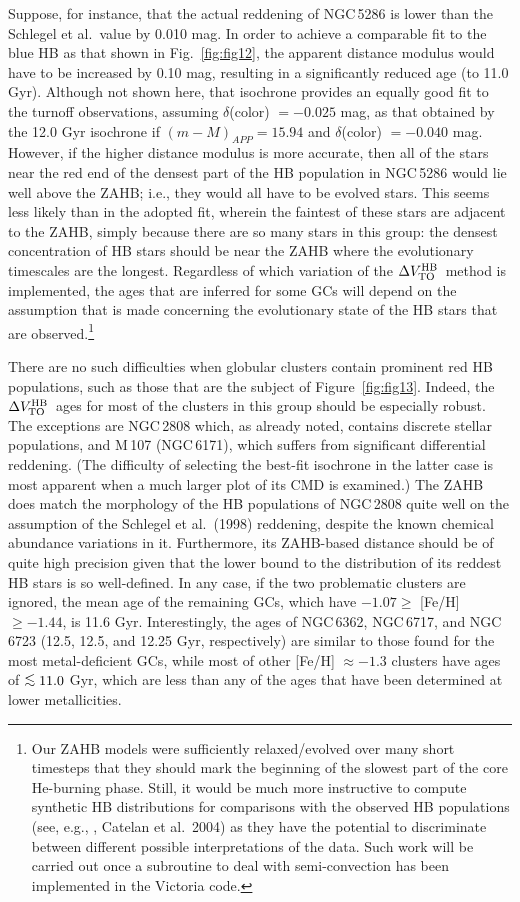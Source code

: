 \documentclass[12pt,preprint]{aastex}
\newcommand\delv{\Delta V^{\rm HB}_{\rm TO}}
\newcommand\lta{\mathrel{\hbox{\raise 0.6 ex \hbox{$<$}\kern
                   -1.8 ex\lower .5 ex\hbox{$\sim$}}}}
\begin{document}
Suppose, for instance, that the actual reddening of NGC$\,$5286 is lower than
the Schlegel et al.~value by 0.010 mag.  In order to achieve a comparable fit to
the blue HB as that shown in Fig.~\ref{fig:fig12}, the apparent distance modulus
would have to be increased by 0.10 mag, resulting in a significantly reduced age
(to 11.0 Gyr).  Although not shown here, that isochrone provides an equally good
fit to the turnoff observations, assuming $\delta$(color) $= -0.025$ mag, as
that obtained by the 12.0 Gyr isochrone if $(m-M)_{APP} = 15.94$ and
$\delta$(color) $= -0.040$ mag. However, if the higher distance modulus is more
accurate, then all of the stars near the red end of the densest part of the HB
population in NGC$\,$5286 would lie well above the ZAHB; i.e., they would all
have to be evolved stars.  This seems less likely than in the adopted fit,
wherein the faintest of these stars are adjacent to the ZAHB, simply because
there are so many stars in this group: the densest concentration of HB stars
should be near the ZAHB where the evolutionary timescales are the longest.
Regardless of which variation of the $\delv$\ method is implemented, the ages
that are inferred for some GCs will depend on the assumption that is made
concerning the evolutionary state of the HB stars that are
observed.\footnote{Our ZAHB models were sufficiently relaxed/evolved over many
short timesteps that they should mark the beginning of the slowest part of the
core He-burning phase.  Still, it would be much more instructive to compute
synthetic HB distributions for comparisons with the observed HB populations
(see, e.g., \citealt{ccc04}, Catelan et al.~2004) as they have the potential to
discriminate between different possible interpretations of the data.  Such work
will be carried out once a subroutine to deal with semi-convection has been
implemented in the Victoria code.}

There are no such difficulties when globular clusters contain prominent red HB
populations, such as those that are the subject of Figure~\ref{fig:fig13}.
Indeed, the $\delv$\ ages for most of the clusters in this group should be
especially robust.  The exceptions are NGC$\,$2808 which, as already noted,
contains discrete stellar populations, and M$\,$107 (NGC$\,$6171), which suffers
from significant differential reddening.  (The difficulty of selecting the
best-fit isochrone in the latter case is most apparent when a much larger plot
of its CMD is examined.)  The ZAHB does match the morphology of the HB
populations of NGC$\,$2808 quite well on the assumption of the Schlegel et
al.~(1998) reddening, despite the known chemical abundance variations in it.
Furthermore, its ZAHB-based distance should be of quite high precision
given that the lower bound to the distribution of its reddest HB stars is
so well-defined.  In any case, if the two problematic clusters are ignored,
the mean age of the remaining GCs, which have $-1.07 \ge$ [Fe/H] $\ge -1.44$,
is 11.6 Gyr.  Interestingly, the ages of NGC$\,$6362, NGC$\,$6717, and
NGC$\,$6723 (12.5, 12.5, and 12.25 Gyr, respectively) are similar to those
found for the most metal-deficient GCs, while most of other [Fe/H] $\approx
-1.3$ clusters have ages of $\lta 11.0$ Gyr, which are less than any of the
ages that have been determined at lower metallicities.  
\end{document}
